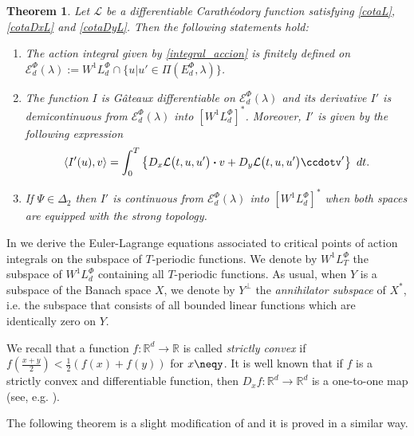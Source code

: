 \documentclass[twoside]{article}
\newtheorem{thm}{Theorem}[section]
\theoremstyle{remark}
\newcommand{\lphi}{L^{\Phi}}
\newcommand{\ephi}{E^{\Phi}}
\newcommand{\wphi}{W^{1}\lphi}
\newcommand{\domi}{\mathcal{E}^{\Phi}_d(\lambda)}
\renewcommand{\b}[1]{\boldsymbol{#1}}
\newcommand{\ccdot}{\b{\cdot}}
\begin{document}
\begin{thm}\label{teorema_acotacion}
Let $\mathcal{L}$ be a differentiable Carath\'eodory function satisfying \eqref{cotaL}, \eqref{cotaDxL} and \eqref{cotaDyL}. 
Then the following statements hold:
\begin{enumerate}
\item \label{T1item1} \label{A1} The action integral given by \eqref{integral_accion}
is finitely defined on $\domi:=W^{1}\lphi_d\cap\{u|u'\in\Pi(\ephi_d,\lambda)\}$.

\item\label{T1item3} The function  $I$ is G\^ateaux differentiable on $\domi$ and  its derivative $I'$ is demicontinuous from $\domi$  into $\left[\wphi_d \right]^*$. Moreover, $I'$ is given by the following expression
\begin{equation}\label{DerAccion}
\langle  I'(u),v\rangle= \int_0^T \left\{D_{x}\mathcal{L}\big(t,u,u'\big)\ccdot v+ D_{y}\mathcal{L}\big(t,u,u'\big)\ccdotv'\right\} \ dt.
\end{equation}

\item\label{T1item4}  If  $\Psi \in \Delta_2$ then 
  $I'$ is continuous from $\domi$ into $\left[\wphi_d\right]^*$ when both spaces are equipped with the strong topology.
\end{enumerate}
\end{thm}





In \cite{ABGMS2015} we derive the Euler-Lagrange equations associated to critical points of action integrals on the subspace of $T$-periodic functions.  
We denote by $\wphi_T$ the subspace of $\wphi_d$ containing all  $T$-periodic functions. As usual, when $Y$ is a subspace of
the Banach space $X$, we denote by $Y^{\perp}$ the \emph{annihilator subspace} of $X^*$, i.e. the subspace
that consists of all  bounded linear functions which are identically zero on $Y$.

We recall that  a function $f: \mathbb{R}^d \to \mathbb{R}$ is called \emph{strictly convex} if 
$f\left(\tfrac{x+y}{2}\right)< \tfrac{1}{2} \left(f\left(
x\right)+f\left( y\right)\right)$ for  $x\neqy$.
It is  well known that if $f$ is a strictly convex and differentiable function, then
$D_{x}f:\mathbb{R}^d\to\mathbb{R}^d$ is a one-to-one map  (see, e.g. \cite[Thm. 12.17]{rockafellar2009variational}).

The following theorem is a slight modification of  \cite[Th. 4.1]{ABGMS2015} and it is proved in a similar way.
\end{document}
